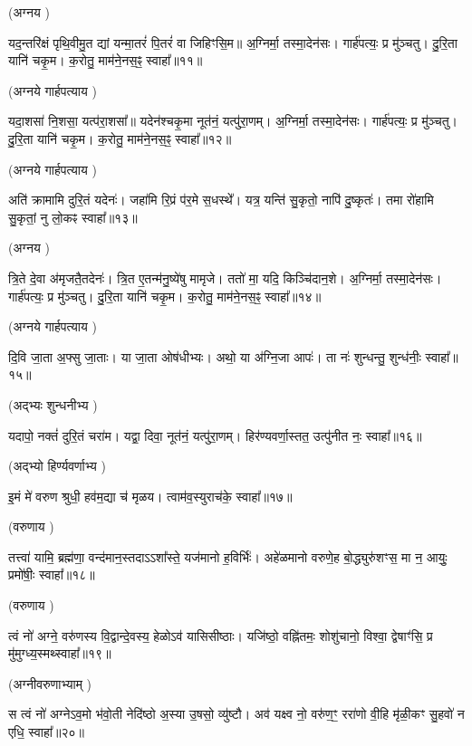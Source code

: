 (अग्नय \idam)


यद॒न्तरि॑क्षं पृथि॒वीमु॒त द्यां यन्मा॒तरं॑ पि॒तरं॑ वा जिहिꣳसि॒म॥
अ॒ग्निर्मा॒ तस्मा॒देन॑सः। गार्\mbox{}ह॑पत्यः॒ प्र मु॑ञ्चतु। 
दु॒रि॒ता यानि॑ चकृ॒म। क॒रोतु॒ माम॑ने॒नस॒ꣴ॒ स्वाहा᳚॥११॥

(अग्नये गार्हपत्याय \idam)



यदा॒शसा॑ नि॒शसा॒ यत्प॑रा॒शसा᳚॥ यदेन॑श्चकृ॒मा नूत॑नं॒ यत्पु॑रा॒णम्।
अ॒ग्निर्मा॒ तस्मा॒देन॑सः। गार्\mbox{}ह॑पत्यः॒ प्र मु॑ञ्चतु। 
दु॒रि॒ता यानि॑ चकृ॒म। क॒रोतु॒ माम॑ने॒नस॒ꣴ॒ स्वाहा᳚॥१२॥

(अग्नये गार्हपत्याय \idam)



अति॑ क्रामामि दुरि॒तं यदेनः॑। जहा॑मि रि॒प्रं प॑र॒मे स॒धस्थे᳚।
यत्र॒ यन्ति॑ सु॒कृतो॒ नापि॑ दु॒ष्कृतः॑।
तमा रो॑हामि सु॒कृतां॒ नु लो॒कꣴ स्वाहा᳚॥१३॥

(अग्नय \idam)

त्रि॒ते दे॒वा अ॑मृजतै॒तदेनः॑।
त्रि॒त ए॒तन्म॑नु॒ष्ये॑षु मामृजे।
ततो॑ मा॒ यदि॒ किञ्चि॑दान॒शे।
अ॒ग्निर्मा॒ तस्मा॒देन॑सः। गार्\mbox{}ह॑पत्यः॒ प्र मु॑ञ्चतु। 
दु॒रि॒ता यानि॑ चकृ॒म। क॒रोतु॒ माम॑ने॒नस॒ꣴ॒ स्वाहा᳚॥१४॥

(अग्नये गार्हपत्याय \idam)

दि॒वि जा॒ता अ॒फ्सु जा॒ताः।
या जा॒ता ओष॑धीभ्यः।
अथो॒ या अ॑ग्नि॒जा आपः॑।
ता नः॑ शुन्धन्तु॒ शुन्ध॑नीः॒ स्वाहा᳚॥१५॥

(अद्भ्यः शुन्धनीभ्य \idam)

यदापो॒ नक्तं॑ दुरि॒तं चरा॑म।
यद्वा॒ दिवा॒ नूत॑नं॒ यत्पु॑रा॒णम्।
हिर॑ण्यवर्णा॒स्तत॒ उत्पु॑नीत नः॒ स्वाहा᳚॥१६॥

(अद्भ्यो हिर्ण्यवर्णाभ्य \idam)


इ॒मं मे॑ वरुण श्रुधी॒ हव॑म॒द्या च॑ मृळय। त्वाम॑व॒स्युराच॑के॒ स्वाहा᳚॥१७॥

(वरुणाय \idam)

तत्त्वा॑ यामि॒ ब्रह्म॑णा॒ वन्द॑मान॒स्तदाऽऽशा᳚स्ते॒ यज॑मानो ह॒विर्भिः॑।
अहे॑ळमानो वरुणे॒ह बो॒द्ध्युरु॑शꣳस॒ मा न॒ आयुः॒ प्रमो॑षीः॒ स्वाहा᳚॥१८॥

(वरुणाय \idam)


त्वं नो॑ अग्ने॒ वरु॑णस्य वि॒द्वान्दे॒वस्य॒ हेळो\-ऽव॑ यासिसीष्ठाः।
यजि॑ष्ठो॒ वह्नि॑तमः॒ शोशु॑चानो॒ विश्वा॒ द्वेषाꣳ॑सि॒ प्र मु॑मुग्ध्य॒स्मथ्स्वाहा᳚॥१९॥

(अग्नीवरुणाभ्याम् \idam)



स त्वं नो॑ अग्ने\-ऽव॒मो भ॑वो॒ती नेदि॑ष्ठो अ॒स्या उ॒षसो॒ व्यु॑ष्टौ।
अव॑ यक्ष्व नो॒ वरु॑ण॒ꣳ॒ ररा॑णो वी॒हि मृ॑ळी॒कꣳ सु॒हवो॑ न एधि॒ स्वाहा᳚॥२०॥


